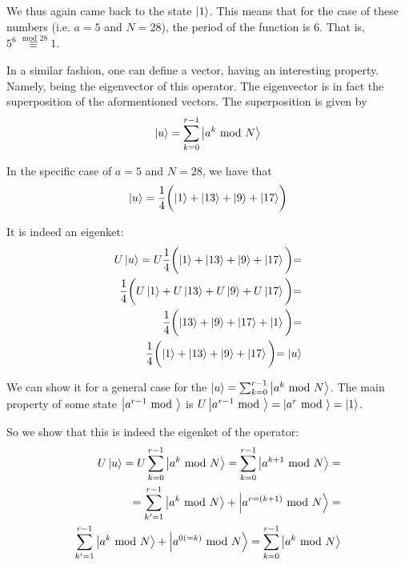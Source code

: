 We thus again came back to the state $\ket{1}$. This means that for the case of 
these numbers (i.e. $a=5$ and $N=28$), the period of the function is $6$. That is, 
$5^6 \stackrel{\text{ mod } 28}{\equiv} 1$.

In a similar fashion, one can define a vector, having an interesting property. 
Namely, being the eigenvector of this operator. The eigenvector 
is in fact the superposition of the aformentioned vectors. 
The superposition is given by 
\begin{gather}
  \ket{u} = \sum_{k=0}^{r-1} \ket{a^k\text{ mod }N}
\end{gather}

In the specific case of $a=5$ and $N=28$, we have that 
\begin{gather}
  \ket{u} = \frac{1}{4}\biggl(\ket{1} + \ket{13} + \ket{9} + \ket{17} \biggr)
\end{gather}

It is indeed an eigenket:
\begin{equation}
\begin{split}
  U\ket{u} = U\frac{1}{4}\biggl(\ket{1} + \ket{13} + \ket{9} + \ket{17}\biggl) = \\
    \frac{1}{4} \biggl(U\ket{1} + U\ket{13} + U\ket{9} + U\ket{17}\biggl) = \\
      \frac{1}{4} \biggl(\ket{13} + \ket{9} + \ket{17} + \ket{1}\biggl) = \\
        \frac{1}{4}\biggl(\ket{1} + \ket{13} + \ket{9} + \ket{17}\biggl) = \ket{u}
\end{split}
\end{equation}

We can show it for a general case for the $\ket{u} = \sum_{k=0}^{r-1} \ket{a^k \text{ mod } N}$. 
The main property of some state $\ket{a^{r-1} \text{ mod }}$ is 
$U\ket{a^{r-1} \text{ mod }} = \ket{a^{r} \text{ mod }} = \ket{1}$.

So we show that this is indeed the eigenket of the operator: 
\begin{equation}
  \begin{split}
    U\ket{u} = U\sum_{k=0}^{r-1} \ket{a^k \text{ mod } N} = \sum_{k=0}^{r-1} \ket{a^{k+1} \text{ mod } N} = \\
    = \sum_{k'=1}^{r-1} \ket{a^k \text{ mod } N} + \ket{a^{r = (k+1)} \text{ mod } N} = \\ 
    \sum_{k'=1}^{r-1} \ket{a^k \text{ mod } N} + 
    \ket{a^{0(=k)} \text{ mod } N} = \sum_{k=0}^{r-1} \ket{a^k \text{ mod }N} 
  \end{split}
  \label{eq:shors_eigenvec_proof_1}
\end{equation}

